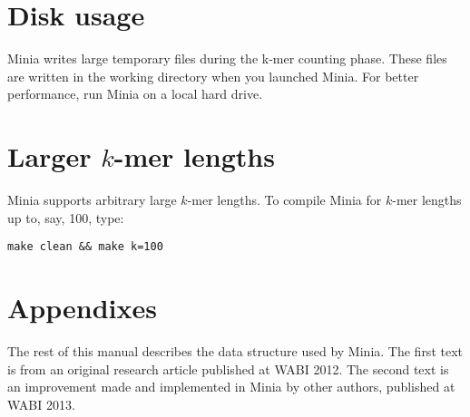\documentclass[a4paper]{article}
\begin{document}
\section{Disk usage}

Minia writes large temporary files during the k-mer counting phase. These files are written in the working directory when you launched Minia. For better performance, run Minia on a local hard drive. 

\section{Larger $k$-mer lengths}

Minia supports arbitrary large $k$-mer lengths. To compile Minia for $k$-mer lengths up to, say, 100, type:
\begin{verbatim}
make clean && make k=100
\end{verbatim}

\section{Appendixes}

The rest of this manual describes the data structure used by Minia.
The first text is from an original research article published at WABI 2012. The second text is an improvement made and implemented in Minia by other authors, published at WABI 2013.



\end{document}
